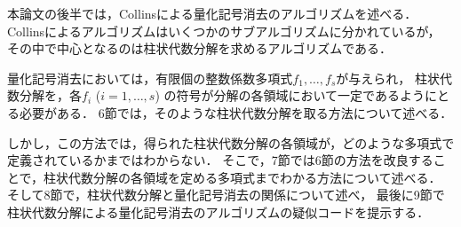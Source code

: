 \documentclass[uplatex, dvipdfmx]{jsarticle}
\theoremstyle{definition}
\begin{document}
本論文の後半では，Collinsによる量化記号消去のアルゴリズムを述べる．
Collinsによるアルゴリズムはいくつかのサブアルゴリズムに分かれているが，
その中で中心となるのは柱状代数分解を求めるアルゴリズムである．

量化記号消去においては，有限個の整数係数多項式$f_1, \dots, f_s$が与えられ，
柱状代数分解を，各$f_i$ ($i=1,\dots,s$) の符号が分解の各領域において一定であるようにとる必要がある．
6節では，そのような柱状代数分解を取る方法について述べる．

しかし，この方法では，得られた柱状代数分解の各領域が，どのような多項式で定義されているかまではわからない．
そこで，7節では6節の方法を改良することで，柱状代数分解の各領域を定める多項式までわかる方法について述べる．
そして8節で，柱状代数分解と量化記号消去の関係について述べ，
最後に9節で柱状代数分解による量化記号消去のアルゴリズムの疑似コードを提示する．




\end{document}
